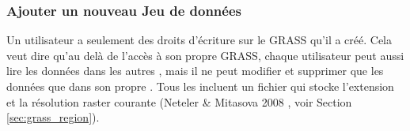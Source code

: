\subsubsection{Ajouter un nouveau Jeu de donn\'ees}\label{sec:add_mapset}


Un utilisateur a seulement des droits d'\'ecriture sur le  GRASS qu'il a cr\'e\'e. Cela veut dire qu'au del\`a de l'acc\`es \`a son propre  GRASS, chaque utilisateur peut aussi lire les donn\'ees dans les autres , mais il ne peut modifier et supprimer que les donn\'ees que dans son propre . Tous les  incluent un fichier  qui stocke l'extension et la r\'esolution raster courante (Neteler \& Mitasova 2008 \cite{neteler_mitasova08}, voir Section \ref{sec:grass_region}). 


